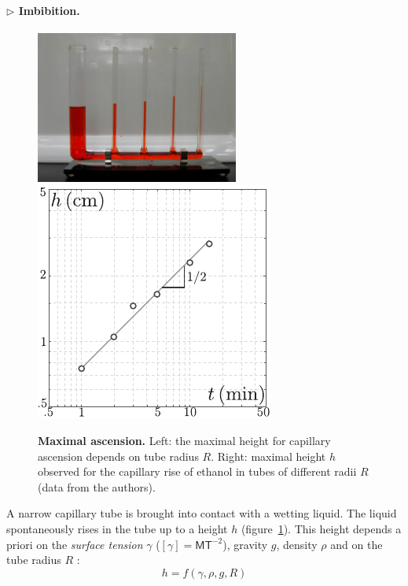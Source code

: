 \documentclass[11pt,a4paper]{article}
\begin{document}
\paragraph{$\rhd$ Imbibition.}  
\begin{figure}[ht]
    \centering
    \includegraphics[height=5cm,valign=m]{capillaryrise.JPG}
    \hspace{1cm}
    \includegraphics[valign=m,page=2]{lucas.pdf}
    \caption{\textbf{Maximal ascension.} Left: the maximal height for capillary ascension depends on tube radius $R$. Right: maximal height $h$ observed for the capillary rise of ethanol in tubes of different radii $R$ (data from the authors).}
    \label{fig:jurin}
\end{figure}
A narrow capillary tube is brought into contact with a wetting liquid. The liquid spontaneously rises in the tube up to a height $h$ (figure~\ref{fig:jurin}). This height depends a priori on the \textit{surface tension} $\gamma$ ($[\gamma] = \mathsf{MT}^{-2}$), gravity $g$, density $\rho$ and on the tube radius $R$ :
\begin{equation}
h = f(\gamma, \rho, g, R)
\end{equation}
\end{document}
